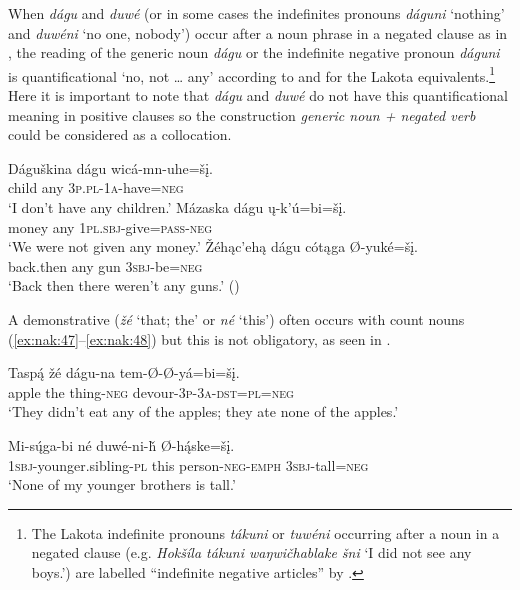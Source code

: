 \documentclass[output=paper,colorlinks,citecolor=brown]{langscibook}
\begin{document}
When \textit{dágu} and \textit{duwé} (or in some cases the indefinites pronouns \textit{dáguni} ‘nothing’ and \textit{duwéni} ‘no one, nobody’) occur after a noun phrase in a negated clause as in , the reading of the generic noun \textit{dágu} or the indefinite negative pronoun \textit{dáguni} is quantificational ‘no, not … any’ according to \citet[361]{Cumberland2005} and \citet[112]{UllrichBlackbear2018} for the Lakota equivalents.\footnote{The Lakota indefinite pronouns \textit{tákuni} or \textit{tuwéni} occurring after a noun in a negated clause (e.g. \textit{Hokšíla tákuni waŋwičhablake šni} ‘I did not see any boys.’) are labelled “indefinite negative articles” by \citet[812]{Ullrich2011}.} Here it is important to note that \textit{dágu} and \textit{duwé} do not have this quantificational meaning in positive clauses so the construction \textit{generic noun + negated verb} could be considered as a collocation. 

\ea\label{ex:nak:46}
    \ea\label{ex:nak:46a}
        \gll Dáguškina dágu wicá-mn-uhe=šį. \\
             child any \textsc{3p.pl-1a}-have=\textsc{neg} \\
        \glt ‘I don’t have any children.’ \citep[361]{Cumberland2005}
    \ex\label{ex:nak:46b}
        \gll Mázaska dágu ų-k’ú=bi=šį. \\
             money any \textsc{1pl.sbj}-give=\textsc{pass-neg} \\
        \glt ‘We were not given any money.’
    \ex\label{ex:nak:46c}
        \gll  Žéhąc’ehą dágu cótąga Ø-yuké=šį. \\
             back.then any gun \textsc{3sbj}-be=\textsc{neg} \\
        \glt ‘Back then there weren’t any guns.’ (\citealt[78]{ParksDeMallie2012b})

    \z
\z 

A demonstrative (\textit{žé} ‘that; the’ or \textit{né} ‘this’) often occurs with count nouns (\ref{ex:nak:47}--\ref{ex:nak:48}) but this is not obligatory, as seen in . 

\ea\label{ex:nak:47}
    \gll Tasp\'{ą} žé dágu-na tem-Ø-Ø-yá=bi=šį. \\
         apple the thing-\textsc{neg} devour-\textsc{3p-3a-dst=pl=neg} \\
    \glt ‘They didn’t eat any of the apples; they ate none of the apples.’ \citep[360]{Cumberland2005}
\z 

\ea\label{ex:nak:48}
    \gll Mi-s\'{ų}ga-bi né duwé-ni-ȟ Ø-h\'{ą}ske=šį. \\
         1\textsc{sbj}-younger.sibling-\textsc{pl} this person-\textsc{neg-emph} \textsc{3sbj}-tall=\textsc{neg} \\
    \glt ‘None of my younger brothers is tall.’
\z 
\end{document}
